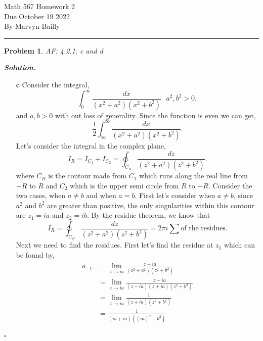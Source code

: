 \documentclass[12pt]{report}
\newtheorem{problem}{Problem}
\newenvironment{solution}[1][\it{Solution}]{\textbf{#1. } }{$\square$}
\def\ointcc{{\ointctrclockwise}}
\begin{document}
\large

\begin{center}
 Math 567 Homework 2\\
 Due October 19 2022\\
 By Marvyn Bailly\\
\end{center}

\normalsize

\hrule



\begin{problem}
    AF: 4.2.1: c and d 
\end{problem}

\begin{solution}
    \noindent
    \begin{enumerate}
        \item [\bf{c}]
        Consider the integral,
        \[
            \int_0^\infty \frac{dx}{(x^2 + a^2)(x^2+b^2)} ~~~ a^2,b^2 > 0,
        \]
        and $a,b>0$ with out loss of generality. Since the function is even we can get,
        \[
            \frac{1}{2}\int_{\infty}^\infty \frac{dx}{(x^2 + a^2)(x^2+b^2)}.    
        \]
        Let's consider the integral in the complex plane,
        \[
            I_R = I_{C_1} + I_{C_2} =\ointcc_{C_R} \frac{dz}{(z^2 + a^2)(z^2+b^2)}.    
        \]
        where $C_R$ is the contour made from $C_1$ which runs along the real line from $-R$ to $R$ and $C_2$ which is the upper semi circle from $R$ to $-R$. Consider the two cases, when $a\neq b$ and when $a=b$. First let's consider when $a\neq b$, since $a^2$ and $b^2$ are greater than positive, the only singularities within this contour are $z_1 = ia$ and $z_2 = ib$. By the residue theorem, we know that
        \[
            I_R = \ointcc_{C_R} \frac{dz}{(z^2 + a^2)(z^2+b^2)} = 2\pi i \sum \text{of the residues.}
        \]
        Next we need to find the residues. First let's find the residue at $z_1$ which can be found by,
        \begin{align*}
            a_{-1} &= \lim_{z \rightarrow ia} \frac{z-ia}{(z^2 + a^2)(z^2 + b^2)}\\
            &= \lim_{z \rightarrow ia} \frac{z-ia}{(z-ia)(z+ia)(z^2 + b^2)}\\
            &= \lim_{z \rightarrow ia} \frac{1}{(z+ia)(z^2 + b^2)}\\
            &= \frac{1}{(ia+ia)((ia)^2 + b^2)}\\

\end{align*}
\end{enumerate}
\end{solution}
\end{document}
